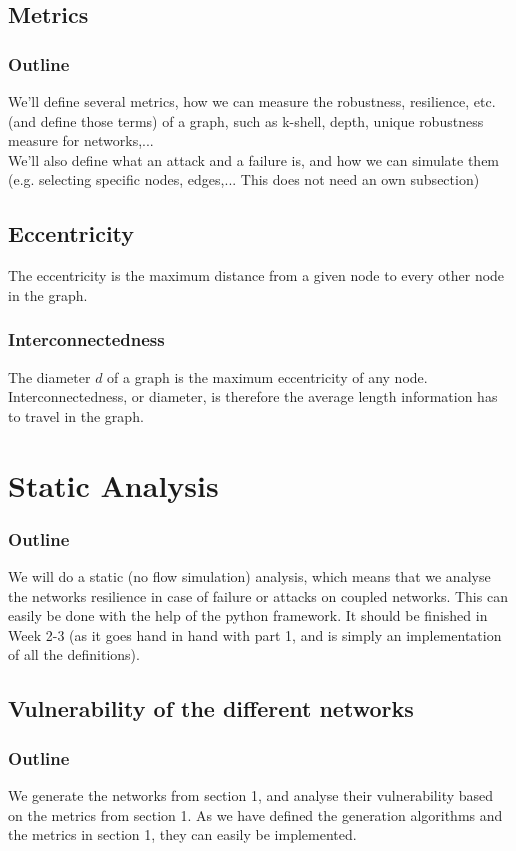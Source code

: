 \documentclass[11pt]{article}
\begin{document}
\subsection{Metrics}
\subsubsection{Outline}
We'll define several metrics, how we can measure the robustness, resilience, etc. (and define those terms) of a graph, such as k-shell, depth, unique robustness measure for networks,... \\
We'll also define what an attack and a failure is, and how we can simulate them (e.g. selecting specific nodes, edges,... This does not need an own subsection)
\subsection{Eccentricity}
The eccentricity is the maximum distance from a given node to every other node in the graph. 
\subsubsection{Interconnectedness}
The diameter $d$ of a graph is the maximum eccentricity of any node. Interconnectedness, or diameter, is therefore the average length information has to travel in the graph.\cite{albert2000error} 
\section{Static Analysis} %
\subsubsection{Outline}
We will do a static (no flow simulation) analysis, which means that we analyse the networks resilience in case of failure or attacks on coupled networks. This can easily be done with the help of the python framework. It should be finished in Week 2-3 (as it goes hand in hand with part 1, and is simply an implementation of all the definitions).
\subsection{Vulnerability of the different networks}
\subsubsection{Outline}
We generate the networks from section 1, and analyse their vulnerability based on the metrics from section 1. As we have defined the generation algorithms and the metrics in section 1, they can easily be implemented.
\end{document}
